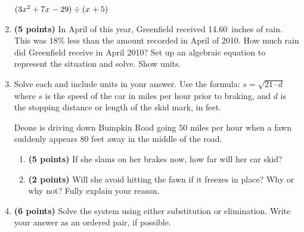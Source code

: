 \documentclass[12pt]{amsart}
\begin{document}
\begin{enumerate}
\vspace{3mm}

$(3x^{2}+7x^{}-29) \div (x^{}+5)$

\vfill  \vfill \vfill
\newpage\def \discount{18}\def \paid{1085.14}\def \rainy{14.60}\def \orcost{1323.34}\def \purcost{919.61}\def \orrainy{17.80}
\item {\bf (5 points)} 
 In April of this year, Greenfield received \rainy\ inches of rain. This was \discount\% less than the amount recorded in April of 2010. How much rain did Greenfield  receive in April 2010? Set up an algebraic equation to represent the situation and solve. Show units.

\vfill 
\def \insvar{21}\def \d{80}\def \zerospeed{40.99}\def \slimit{50}\def \s{58}\def \skidd{160.19}\def \safed{119.048}\def \rsafed{119}

 
\item Solve each and include units in your answer. Use the formula: $s = \sqrt{\insvar \cdot d}$ where $s$ is the speed of the car in miles per hour prior to braking, and $d$ is the stopping distance or length of the skid mark, in feet. 

\vspace{3mm}

Deone is driving down Bumpkin Road going $\slimit$ miles per hour when a fawn suddenly appears $\d$ feet away in the middle of the road. \begin{enumerate}
\item {\bf (5 points)} If she slams on her brakes now, how far will her car skid? \vspace{4cm}
\item {\bf (2 points)} Will she avoid hitting the fawn if it freezes in place? Why or why not? Fully explain your reason. \vspace{3cm}
\end{enumerate}


\newpage\def \xis{2}\def \yis{3}\def \nomatcho{[5,2,2,3]}\def \a{-5}\def \c{-2}\def \b{-2}\def \d{-3}\def \polyonesol{-16}\def \polytwosol{-13}\def \xgoodone{-5x^{}}\def \ygoodone{-2y^{}}\def \xgoodtwo{-2x^{}}\def \ygoodtwo{-3y^{}}\def \unitize{[0,1,0,0,1,0]}\def \mtem{2}\def \ntem{4}\def \ptem{-5}\def \qtem{5}\def \m{2}\def \n{1}\def \p{-5}\def \q{5}\def \polytonesol{7}\def \polyttwosol{5}\def \xtgoodone{2x^{}}\def \ytgoodone{+y^{}}\def \xtgoodtwo{-5x^{}}\def \ytgoodtwo{+5y^{}}
\item {\bf (6 points)} 
 Solve the system using either substitution or elimination. Write your answer as an ordered pair, if possible. 


\end{enumerate}
\end{document}
